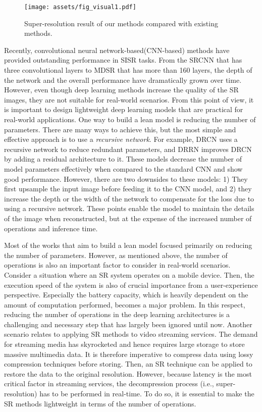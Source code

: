\documentclass[runningheads]{llncs}
\begin{document}
\begin{figure}[t]
\centering
\texttt{[image: assets/fig\_visual1.pdf]}
\caption{Super-resolution result of our methods compared with existing methods.}
\label{fig:intro}
\end{figure}

Recently, convolutional neural network-based(CNN-based) methods have provided outstanding performance in SISR tasks\cite{srcnn2014,vdsr2016,lapsrn2017}. From the SRCNN\cite{srcnn2014} that has three convolutional layers to MDSR\cite{mdsr2017} that has more than 160 layers, the depth of the network and the overall performance have dramatically grown over time. However, even though deep learning methods increase the quality of the SR images, they are not suitable for real-world scenarios. From this point of view, it is important to design lightweight deep learning models that are practical for real-world applications. One way to build a lean model is reducing the number of parameters. There are many ways to achieve this\cite{han2015deep,squeezenet}, but the most simple and effective approach is to use a \textit{recursive network}. For example, DRCN\cite{drcn2016} uses a recursive network to reduce redundant parameters, and DRRN\cite{drnn2017} improves DRCN by adding a residual architecture to it. These models decrease the number of model parameters effectively when compared to the standard CNN and show good performance. However, there are two downsides to these models: 1) They first upsample the input image before feeding it to the CNN model, and 2) they increase the depth or the width of the network to compensate for the loss due to using a recursive network. These points enable the model to maintain the details of the image when reconstructed, but at the expense of the increased number of operations and inference time.

Most of the works that aim to build a lean model focused primarily on reducing the number of parameters. However, as mentioned above, the number of operations is also an important factor to consider in real-world scenarios. Consider a situation where an SR system operates on a mobile device. Then, the execution speed of the system is also of crucial importance from a user-experience perspective. Especially the battery capacity, which is heavily dependent on the amount of computation performed, becomes a major problem. In this respect, reducing the number of operations in the deep learning architectures is a challenging and necessary step that has largely been ignored until now. Another scenario relates to applying SR methods to video streaming services. The demand for streaming media has skyrocketed and hence requires large storage to store massive multimedia data. It is therefore imperative to compress data using lossy compression techniques before storing. Then, an SR technique can be applied to restore the data to the original resolution. However, because latency is the most critical factor in streaming services, the decompression process (i.e., super-resolution) has to be performed in real-time. To do so, it is essential to make the SR methods lightweight in terms of the number of operations.
\end{document}
